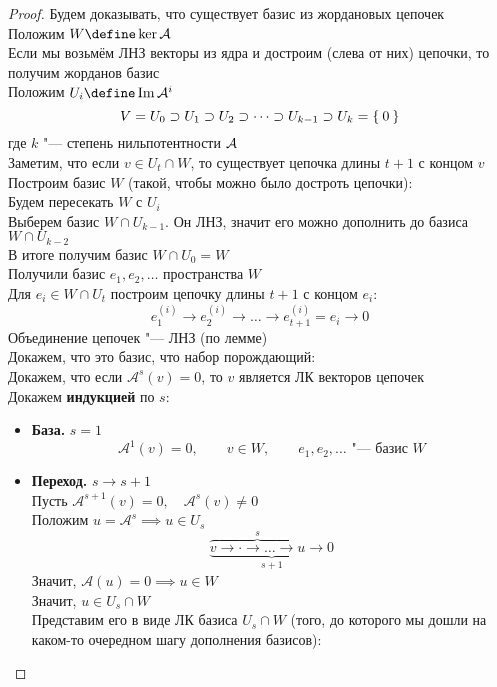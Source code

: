 \begin{proof}
	Будем доказывать, что существует базис из жордановых цепочек \\
	Положим $ W \define \ker \mathcal{A} $ \\
	Если мы возьмём ЛНЗ векторы из ядра и достроим (слева от них) цепочки, то получим жорданов базис \\
	Положим $ U_i \define \Img \mathcal{A}^i $
	$$ V = U_0 \supset U_1 \supset U_2 \supset \dots \supset U_{k - 1} \supset U_k = \Set{0} $$
	где $ k $ "--- степень нильпотентности $ \mathcal{A} $ \\
	Заметим, что если $ v \in U_t \cap W $, то существует цепочка длины $ t + 1 $ с концом $ v $ \\
	Построим базис $ W $ (такой, чтобы можно было достроть цепочки): \\
	Будем пересекать $ W $ с $ U_i $ \\
	Выберем базис $ W \cap U_{k - 1} $. Он ЛНЗ, значит его можно дополнить до базиса $ W \cap U_{k - 2} $ \\
	В итоге получим базис $ W \cap U_0 = W $ \\
	Получили базис $ e_1, e_2, \dots $ пространства $ W $ \\
	Для $ e_i \in W \cap U_t $ построим цепочку длины $ t + 1 $ с концом $ e_i $:
	$$ e_1^{(i)} \to e_2^{(i)} \to \dots \to e_{t + 1}^{(i)} = e_i \to 0 $$
	Объединение цепочек "--- ЛНЗ (по лемме) \\
	Докажем, что это базис, \ie что набор порождающий: \\
	Докажем, что если $ \mathcal{A}^s(v) = 0 $, то $ v $ является ЛК векторов цепочек \\
	Докажем \textbf{индукцией} по $ s $:
	\begin{itemize}
		\item \textbf{База.} $ s = 1 $
		$$ \mathcal{A}^1(v) = 0, \qquad v \in W, \qquad e_1, e_2, \dots \text{ "--- базис } W $$
		\item \textbf{Переход.} $ s \to s + 1 $ \\
		Пусть $ \mathcal{A}^{s + 1}(v) = 0, \quad \mathcal{A}^s(v) \ne 0 $ \\
		Положим $ u = \mathcal{A}^s \implies u \in U_s $
		$$ \underbrace{\overbrace{v \to \cdot \to \dots \to u}^s \to 0}_{s + 1} $$
		Значит, $ \mathcal{A}(u) = 0 \implies u \in W $ \\
		Значит, $ u \in U_s \cap W $ \\
		Представим его в виде ЛК базиса $ U_s \cap W $ (того, до которого мы дошли на каком-то очередном шагу дополнения базисов):

\end{itemize}
\end{proof}
